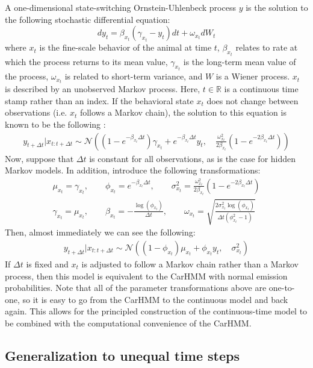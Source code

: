 A one-dimensional state-switching Ornstein-Uhlenbeck process $y$ is the solution to the following stochastic differential equation:
%
$$dy_t = \beta_{x_t}(\gamma_{x_t} - y_t)dt + \omega_{x_t} dW_t$$
%
where $x_t$ is the fine-scale behavior of the animal at time $t$, $\beta_{x_t}$ relates to rate at which the process returns to its mean value, $\gamma_{x_t}$ is the long-term mean value of the process, $\omega_{x_t}$ is related to short-term variance, and $W$ is a Wiener process. $x_t$ is described by an unobserved Markov process. Here, $t \in \mathbb{R}$ is a continuous time stamp rather than an index. If the behavioral state $x_t$ does not change between observations (i.e. $x_t$ follows a Markov chain), the solution to this equation is known to be the following \cite{Michelot:2019}:
%
\begin{align*}
y_{t+\Delta t} | x_{t:t+\Delta t} \sim \mathcal{N}\left((1-e^{-\beta_{x_t}\Delta t})\gamma_{x_t} + e^{-\beta_{x_t}\Delta t} y_t,\quad \frac{\omega_{x_t}^2}{2\beta_{x_t}} (1-e^{-2\beta_{x_t}\Delta t})\right)
\end{align*}
%
Now, suppose that $\Delta t$ is constant for all observations, as is the case for hidden Markov models. In addition, introduce the following transformations:
%
\begin{align}
\mu_{x_t} = \gamma_{x_t}, \qquad \phi_{x_t} = e^{-\beta_{x_t}\Delta t}, \qquad \sigma^2_{x_t} = \frac{\omega_{x_t}^2}{2\beta_{x_t}} (1-e^{-2\beta_{x_t}\Delta t}) \\
\gamma_{x_t} = \mu_{x_t}, \qquad \beta_{x_t} = -\frac{\log(\phi_{x_t})}{\Delta t}, \qquad \omega_{x_t} = \sqrt{\frac{2\sigma^{2}_{x_t}\log(\phi_{x_t})}{\Delta t (\phi_{x_t}^2-1)}}
\label{CarHMM_to_OU}
\end{align}
%
Then, almost immediately we can see the following:
%
\begin{align*}
y_{t+\Delta t} | x_{t:t+\Delta t} \sim \mathcal{N}\left((1-\phi_{x_t})\mu_{x_t} + \phi_{x_t} y_t,\quad \sigma_{x_t}^2 \right)
\end{align*}
%
If $\Delta t$ is fixed and $x_t$ is adjusted to follow a Markov chain rather than a Markov process, then this model is equivalent to the CarHMM with normal emission probabilities. Note that all of the parameter transformations above are one-to-one, so it is easy to go from the CarHMM to the continuous model and back again. This allows for the principled construction of the continuous-time model to be combined with the computational convenience of the CarHMM.

\subsection{Generalization to unequal time steps}

